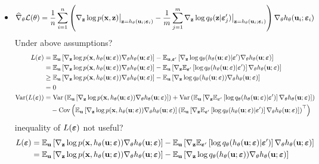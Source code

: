 \documentclass[10pt]{article}
\begin{document}
\begin{itemize}
\item
\[
\widehat{\nabla}_\theta\mathcal{L}(\theta) = \frac{1}{n}\sum_{i=1}^n \left(\nabla_{\mathbf{z}}\log p(\mathbf{x},\mathbf{z})\big|_{\mathbf{z}=h_\theta(\mathbf{u}_i;\bm{\varepsilon}_i)} - \frac{1}{m}\sum_{j=1}^m \nabla_{\mathbf{z}}\log q_\theta(\mathbf{z}|\bm{\varepsilon}_j')\big|_{\mathbf{z}=h_\theta(\mathbf{u}_i;\bm{\varepsilon}_i)} \right)\nabla_\theta h_\theta(\mathbf{u}_i;\bm{\varepsilon}_i)
\]
\todo Under above assumptions?
\begin{align*}
L(\bm{\varepsilon}) &= \mathbb{E}_{\mathbf{u}}\left[\nabla_{\mathbf{z}}\log p(\mathbf{x},h_\theta(\mathbf{u};\bm{\varepsilon}))\nabla_\theta h_\theta(\mathbf{u};\bm{\varepsilon})\right] - \mathbb{E}_{\mathbf{u},\bm{\varepsilon}'}\left[\nabla_{\mathbf{z}}\log q_\theta(h_\theta(\mathbf{u};\bm{\varepsilon})|\bm{\varepsilon}') \nabla_\theta h_\theta(\mathbf{u};\bm{\varepsilon})\right] \\
&= \mathbb{E}_{\mathbf{u}}\left[\nabla_{\mathbf{z}}\log p(\mathbf{x},h_\theta(\mathbf{u};\bm{\varepsilon}))\nabla_\theta h_\theta(\mathbf{u};\bm{\varepsilon})\right] - \mathbb{E}_{\mathbf{u}}\left[\nabla_{\mathbf{z}}\mathbb{E}_{\bm{\varepsilon}'}\left[\log q_\theta(h_\theta(\mathbf{u};\bm{\varepsilon})|\bm{\varepsilon}')\right] \nabla_\theta h_\theta(\mathbf{u};\bm{\varepsilon})\right] \\
&\geq \mathbb{E}_{\mathbf{u}}\left[\nabla_{\mathbf{z}}\log p(\mathbf{x},h_\theta(\mathbf{u};\bm{\varepsilon}))\nabla_\theta h_\theta(\mathbf{u};\bm{\varepsilon})\right] - \mathbb{E}_{\mathbf{u}}\left[\nabla_{\mathbf{z}}\log q_\theta(h_\theta(\mathbf{u};\bm{\varepsilon})) \nabla_\theta h_\theta(\mathbf{u};\bm{\varepsilon})\right] \\
&= 0 \\
\mathrm{Var}(L(\bm{\varepsilon})) &= \mathrm{Var}\left(\mathbb{E}_{\mathbf{u}}\left[\nabla_{\mathbf{z}}\log p(\mathbf{x},h_\theta(\mathbf{u};\bm{\varepsilon}))\nabla_\theta h_\theta(\mathbf{u};\bm{\varepsilon})\right]\right) + \mathrm{Var}\left(\mathbb{E}_{\mathbf{u}}\left[\nabla_{\mathbf{z}}\mathbb{E}_{\bm{\varepsilon}'}\left[\log q_\theta(h_\theta(\mathbf{u};\bm{\varepsilon})|\bm{\varepsilon}')\right] \nabla_\theta h_\theta(\mathbf{u};\bm{\varepsilon})\right]\right) \\
&\quad - \mathrm{Cov}\left(\mathbb{E}_{\mathbf{u}}\left[\nabla_{\mathbf{z}}\log p(\mathbf{x},h_\theta(\mathbf{u};\bm{\varepsilon}))\nabla_\theta h_\theta(\mathbf{u};\bm{\varepsilon})\right]\left(\mathbb{E}_{\mathbf{u}}\left[\nabla_{\mathbf{z}}\mathbb{E}_{\bm{\varepsilon}'}\left[\log q_\theta(h_\theta(\mathbf{u};\bm{\varepsilon})|\bm{\varepsilon}')\right]\nabla_\theta h_\theta(\mathbf{u};\bm{\varepsilon})\right]\right)^\top\right)
\end{align*}
\todo inequality of $L(\bm{\varepsilon})$ not useful?
\begin{align*}
L(\bfeps) &= \E_\bfu\left[\nabla_\bfz\log p(\bfx,h_\theta(\bfu;\bfeps))\nabla_\theta h_\theta(\bfu;\bfeps)\right] - \E_\bfu\left[\nabla_\bfz\E_{\bfeps'}\left[\log q_\theta(h_\theta(\bfu;\bfeps)|\bfeps')\right] \nabla_\theta h_\theta(\bfu;\bfeps)\right] \\
&= \E_\bfu\left[\nabla_\bfz\log p(\bfx,h_\theta(\bfu;\bfeps))\nabla_\theta h_\theta(\bfu;\bfeps)\right] - \E_\bfu\left[\nabla_\bfz\log q_\theta(h_\theta(\bfu;\bfeps)) \nabla_\theta h_\theta(\bfu;\bfeps)\right] \\

\end{align*}
\end{itemize}
\end{document}
